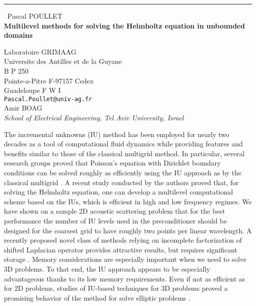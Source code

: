 \documentclass{report}
\begin{document}
\begin{center}
\rule{6in}{1pt} \
{\large Pascal POULLET \\
{\bf Multilevel methods for solving the Helmholtz equation in unbounded domains}}

Laboratoire GRIMAAG \\ Universite des Antilles et de la Guyane \\ B P 250 \\ Pointe-a-Pitre F-97157 Cedex \\ Guadeloupe F W I
\\
{\tt Pascal.Poullet@univ-ag.fr}\\
Amir BOAG\\
{\em School of Electrical Engineering, Tel Aviv University, Israel}\end{center}

The incremental unknowns (IU) method has been employed for nearly
two decades as a tool of computational fluid dynamics while providing
features and benefits similar to those of the classical multigrid method.
In particular, several research groups proved that Poisson's equation
with Dirichlet boundary conditions can be solved roughly as efficiently
using the IU approach as by the classical multigrid \cite{CT91, CT93}.
A recent study \cite{PB07} conducted by the authors proved that,
for solving the Helmholtz equation, one can develop a multilevel
computational scheme based on the IUs, which is efficient in high and low
frequency regimes.
We have shown on a sample 2D acoustic scattering problem that for the
best performance the number of IU levels used in the preconditioner
should be designed for the coarsest grid to have roughly two points per
linear wavelength. A recently proposed novel class of methods relying on
incomplete factorization of shifted Laplacian operator provides
attractive results, but
requires significant storage \cite{E08}. Memory considerations are
especially important when we need to solve 3D problems. To that end, the
IU approach appears to be especially advantageous thanks to its low
memory requirements. Even if not as efficient as for 2D problems, studies
of IU-based techniques for 3D problems proved a promising behavior of the
method for solve elliptic problems \cite{MCT95, SW07}.
\end{document}
